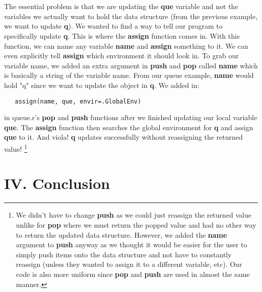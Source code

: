 \documentclass[a4paper, 11pt]{article} %
\begin{document}
\\\\
\indent The essential problem is that we are updating the \textbf{que} variable and not the variables we actually want to hold the data structure (from the previous example, we want to update \textbf{q}). We wanted to find a way to tell our program to specifically update \textbf{q}. This is where the \textbf{assign} function comes in. With this function, we can name any variable \textbf{name} and \textbf{assign} something to it. We can even explicitly tell \textbf{assign} which environment it should look in. To grab our variable name, we added an extra argument in \textbf{push} and \textbf{pop} called \textbf{name} which is basically a string of the variable name. From our queue example, \textbf{name} would hold "q" since we want to update the object in \textbf{q}. We added in:
\begin{verbatim}
   assign(name, que, envir=.GlobalEnv)
\end{verbatim}
in queue.r's \textbf{pop} and \textbf{push} functions after we finished updating our local variable \textbf{que}. The \textbf{assign} function then searches the global environment for \textbf{q} and assign \textbf{que} to it. And viola! \textbf{q} updates successfully without reassigning the returned value! \footnote{We didn't have to change \textbf{push} as we could just reassign the returned value unlike for \textbf{pop} where we must return the popped value and had no other way to return the updated data structure. However, we added the \textbf{name} argument to \textbf{push} anyway as we thought it would be easier for the user to simply push items onto the data structure and not have to constantly reassign (unless they wanted to assign it to a different variable, etc). Our code is also more uniform since \textbf{pop} and \textbf{push} are used in almost the same manner.}

\section*{IV. Conclusion}
\end{document}
